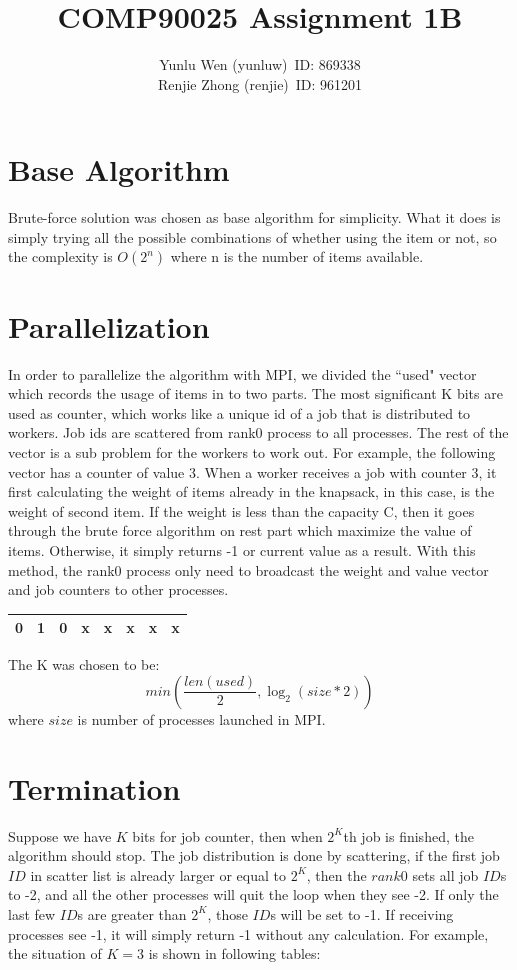 \documentclass[12pt, a4paper, twocolumn]{article}
\title{COMP90025 Assignment 1B}
\author{Yunlu Wen (yunluw)\ ID: 869338\\ Renjie Zhong (renjie)\ ID: 961201}
\begin{document}
    \maketitle

    \section{Base Algorithm}
    Brute-force solution was chosen as base algorithm for simplicity. What it does is simply trying all the possible combinations of whether using the item or not, so the complexity is $O(2^n)$ where n is the number of items available.

    \section{Parallelization}
    In order to parallelize the algorithm with MPI, we divided the ``used" vector which records the usage of items in to two parts. The most significant K bits are used as counter, which works like a unique id of a job that is distributed to workers. Job ids are scattered from rank0 process to all processes. The rest of the vector is a sub problem for the workers to work out. For example, the following vector has a counter of value 3. When a worker receives a job with counter 3, it first calculating the weight of items already in the knapsack, in this case, is the weight of second item. If the weight is less than the capacity C, then it goes through the brute force algorithm on rest part which maximize the value of items. Otherwise, it simply returns -1 or current value as a result. With this method, the rank0 process only need to broadcast the weight and value vector and job counters to other processes.

    \begin{table}[h]
        \centering
        \begin{tabular}{|c|c|c|c|c|c|c|c|}
            \hline
            0 & 1 & 0 & x & x & x & x & x\\
            \hline
        \end{tabular}
    \end{table}

    The K was chosen to be: 
    $$min(\frac{len(used)}{2}, \log_2(size*2))$$
    where $size$ is number of processes launched in MPI.

    \section{Termination}
    Suppose we have $K$ bits for job counter, then when $2^K$th job is finished, the algorithm should stop. The job distribution is done by scattering, if the first job $ID$ in scatter list is already larger or equal to $2^K$, then the $rank0$ sets all job $ID$s to -2, and all the other processes will quit the loop when they see -2. If only the last few $ID$s are greater than $2^K$, those $ID$s will be set to -1. If receiving processes see -1, it will simply return -1 without any calculation. For example, the situation of $K=3$ is shown in following tables:
\end{document}
